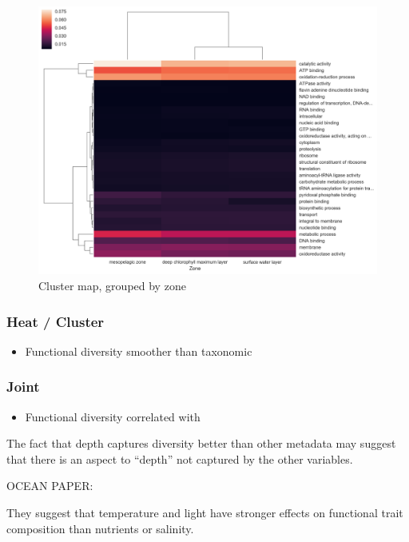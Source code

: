 \documentclass[12pt,a4paper,]{article}
\providecommand{\tightlist}{%
  \setlength{\itemsep}{0pt}\setlength{\parskip}{0pt}}
\begin{document}
\begin{figure}
\centering
\includegraphics{imgs/cluster/cluster_zone.png}
\caption{Cluster map, grouped by zone\label{fig:cluster_zone}}
\end{figure}

\subsubsection{Heat / Cluster}\label{heat-cluster}

\begin{itemize}
\tightlist
\item
  Functional diversity smoother than taxonomic
\end{itemize}

\subsubsection{Joint}\label{joint}

\begin{itemize}
\tightlist
\item
  Functional diversity correlated with
\end{itemize}

The fact that depth captures diversity better than other metadata may
suggest that there is an aspect to ``depth'' not captured by the other
variables.

OCEAN PAPER:

They suggest that temperature and light have stronger effects on
functional trait composition than nutrients or salinity.
\end{document}
